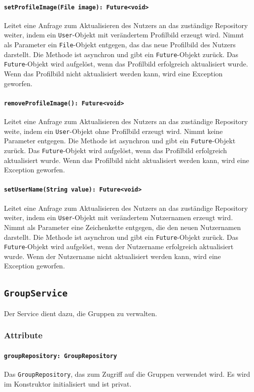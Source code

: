 \documentclass[parskip=full]{scrartcl}
\begin{document}
\paragraph{\texttt{setProfileImage(File image): Future<void>}}
Leitet eine Anfrage zum Aktualisieren des Nutzers an das zuständige Repository weiter, indem ein \texttt{User}-Objekt mit verändertem Profilbild erzeugt wird. Nimmt als Parameter ein \texttt{File}-Objekt entgegen, das das neue Profilbild des Nutzers darstellt. Die Methode ist asynchron und gibt ein \texttt{Future}-Objekt zurück. Das \texttt{Future}-Objekt wird aufgelöst, wenn das Profilbild erfolgreich aktualisiert wurde. Wenn das Profilbild nicht aktualisiert werden kann, wird eine Exception geworfen.
\paragraph{\texttt{removeProfileImage(): Future<void>}}
Leitet eine Anfrage zum Aktualisieren des Nutzers an das zuständige Repository weite, indem ein \texttt{User}-Objekt ohne Profilbild erzeugt wird. Nimmt keine Parameter entgegen. Die Methode ist asynchron und gibt ein \texttt{Future}-Objekt zurück. Das \texttt{Future}-Objekt wird aufgelöst, wenn das Profilbild erfolgreich aktualisiert wurde. Wenn das Profilbild nicht aktualisiert werden kann, wird eine Exception geworfen.
\paragraph{\texttt{setUserName(String value): Future<void>}}
Leitet eine Anfrage zum Aktualisieren des Nutzers an das zuständige Repository weiter, indem ein \texttt{User}-Objekt mit verändertem Nutzernamen erzeugt wird. Nimmt als Parameter eine Zeichenkette entgegen, die den neuen Nutzernamen darstellt. Die Methode ist asynchron und gibt ein \texttt{Future}-Objekt zurück. Das \texttt{Future}-Objekt wird aufgelöst, wenn der Nutzername erfolgreich aktualisiert wurde. Wenn der Nutzername nicht aktualisiert werden kann, wird eine Exception geworfen.

\newpage
\subsection{\texttt{GroupService}}
Der Service dient dazu, die Gruppen zu verwalten.
\subsubsection*{Attribute}
\paragraph{\texttt{groupRepository: GroupRepository}}
Das \texttt{GroupRepository}, das zum Zugriff auf die Gruppen verwendet wird. Es wird im Konstruktor initialisiert und ist privat.
\end{document}
